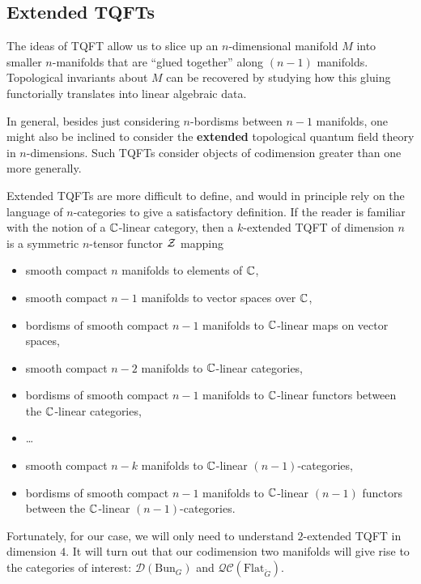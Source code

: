 	\subsection{Extended TQFTs} %
	\label{sub:extended_tqfts}
		
	The ideas of TQFT allow us to slice up an $n$-dimensional manifold $M$ into smaller $n$-manifolds that are ``glued together'' along $(n-1)$ manifolds. Topological invariants about $M$ can be recovered by studying how this gluing functorially translates into linear algebraic data.
	
	In general, besides just considering $n$-bordisms between $n-1$ manifolds, one might also be inclined to consider the  \textbf{extended} topological quantum field theory in $n$-dimensions. Such TQFTs consider objects of codimension greater than one more generally. 
	
	Extended TQFTs are more difficult to define, and would in principle rely on the language of $n$-categories to give a satisfactory definition. If the reader is familiar with the notion of a $\mathbb{C}$-linear category, then a $k$-extended TQFT of dimension $n$ is \cite{nlab:extended_topological_quantum_field_theory} a symmetric $n$-tensor functor $\mathcal{Z}$ mapping
	\begin{itemize}
		\item smooth compact $n$ manifolds to elements of $\mathbb{C}$,
		\item smooth compact $n-1$ manifolds to vector spaces over $\mathbb{C}$,
		\item bordisms of smooth compact $n-1$ manifolds to $\mathbb{C}$-linear maps on vector spaces,
		\item smooth compact $n-2$ manifolds to $\mathbb{C}$-linear categories,
		\item bordisms of smooth compact $n-1$ manifolds to $\mathbb{C}$-linear functors between the $\mathbb{C}$-linear categories,
		\item \dots 
		\item smooth compact $n-k$ manifolds to $\mathbb{C}$-linear $(n-1)$-categories,
		\item bordisms of smooth compact $n-1$ manifolds to $\mathbb{C}$-linear $(n-1)$ functors between the $\mathbb{C}$-linear $(n-1)$-categories.
	\end{itemize}
	
	
	Fortunately, for our case, we will only need to understand $2$-extended TQFT in dimension $4$. It will turn out that our codimension two manifolds will give rise to the categories of interest: $\mathcal D(\mathrm{Bun}_G)$ and $\mathcal{QC}(\mathrm{Flat}_{\check G})$. %
	
